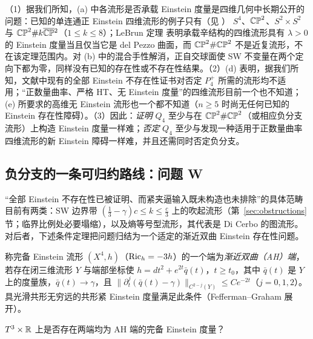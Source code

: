 \begin{remark}
（1）据我们所知，(a) 中各流形是否承载 Einstein 度量是四维几何中长期公开的问题：已知的单连通正 Einstein 四维流形的例子只有（见 \cite{Viaclovsky,LeBrun03}） $S^4$、$\mathbb{CP}^2$、$S^2\times S^2$ 与 $\mathbb{CP}^2\#k\overline{\mathbb{CP}}{}^2$（$1\le k\le8$）；LeBrun 定理 \cite{LeBrun09} 表明承载辛结构的四维流形具有 $\lambda>0$ 的 Einstein 度量当且仅当它是 del Pezzo 曲面，而 $\mathbb{CP}^2\#\mathbb{CP}^2$ 不是近复流形，不在该定理范围内。对 (b) 中的混合手性解消，正自交球面使 SW 不变量在两个定向下都为零，同样没有已知的存在性或不存在性结果。（2）(d) 表明，据我们所知，文献中现有的全部 Einstein 不存在性证书对否定 $P_4^+$ 所需的流形均不适用；“正数量曲率、严格 HT、无 Einstein 度量”的四维流形目前一个也不知道；(e) 所要求的高维无 Einstein 流形也一个都不知道（$n\ge5$ 时尚无任何已知的 Einstein 存在性障碍）。（3）因此：\emph{证明} $Q_4$ 至少与在 $\mathbb{CP}^2\#\mathbb{CP}^2$（或相应负分支流形）上构造 Einstein 度量一样难；\emph{否定} $Q_4$ 至少与发现一种适用于正数量曲率四维流形的新 Einstein 障碍一样难，并且还需同时否定负分支。
\end{remark}

\subsection{负分支的一条可归约路线：问题 W}
“全部 Einstein 不存在性已被证明、而紧夹逼输入既未构造也未排除”的具体范畴目前有两类：SW 边界带 $(\frac13-\gamma)c\le k\le\frac c3$ 上的吹起流形（第~\ref{sec:obstructions}节；临界比例处必要塌缩），以及熵等号型流形，其代表是 Di Cerbo 的图流形。对后者，下述条件定理把问题归结为一个适定的渐近双曲 Einstein 存在性问题。

称完备 Einstein 流形 $(X^4,h)$（$\operatorname{Ric}_h=-3h$）的一个端为\emph{渐近双曲（AH）端}，若存在闭三维流形 $Y$ 与端部坐标使 $h=dt^2+e^{2t}\bar q(t)$，$t\ge t_0$，其中 $\bar q(t)$ 是 $Y$ 上的度量族，$\bar q(t)\to\gamma$，且 $\|\partial_t^j(\bar q(t)-\gamma)\|_{C^{2-j}(Y)}\le Ce^{-2t}$（$j=0,1,2$）。具光滑共形无穷远的共形紧 Einstein 度量满足此条件（Fefferman--Graham 展开）。

\begin{problem}[问题 W]\label{prob:W}
$T^3\times\mathbb R$ 上是否存在两端均为 AH 端的完备 Einstein 度量？
\end{problem}

